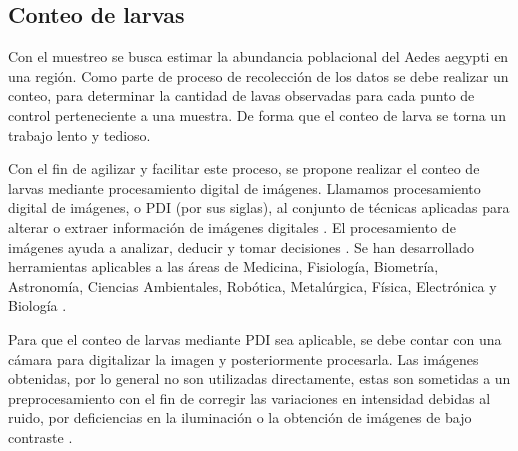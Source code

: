 \subsection{Conteo de larvas}
Con el muestreo se busca estimar la abundancia poblacional del Aedes aegypti en una región. Como
parte de proceso de recolección de los datos se debe realizar un conteo, para determinar la
cantidad de lavas observadas para cada punto de control perteneciente a una muestra. De forma que
el conteo de larva se torna un trabajo lento y tedioso.

Con el fin de agilizar y facilitar este proceso, se propone realizar el conteo de larvas mediante
procesamiento digital de imágenes. Llamamos procesamiento digital de imágenes, o PDI (por sus
siglas), al conjunto de técnicas aplicadas para alterar o extraer información de imágenes digitales
\cite{moreira2009implementacion, ortiz2013procesamiento}. El procesamiento de imágenes ayuda a
analizar, deducir y tomar decisiones \cite{ortiz2013procesamiento}. Se han desarrollado
herramientas aplicables a las áreas de Medicina, Fisiología, Biometría, Astronomía, Ciencias
Ambientales, Robótica, Metalúrgica, Física, Electrónica y Biología \cite{ortiz2013procesamiento, santillan2008deteccion, moreira2009implementacion}.

Para que el conteo de larvas mediante PDI sea aplicable, se debe contar con una cámara para
digitalizar la imagen y posteriormente procesarla. Las imágenes obtenidas, por lo general no son
utilizadas directamente, estas son sometidas a un preprocesamiento con el fin de corregir las
variaciones en intensidad debidas al ruido, por deficiencias en la iluminación o la obtención de
imágenes de bajo contraste \citep{santillan2008deteccion}.

